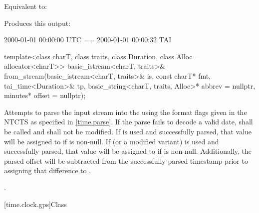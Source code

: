 \begin{itemdescr}
\pnum
\effects
Equivalent to:

\pnum
\begin{example}

Produces this output:

\begin{outputblock}
2000-01-01 00:00:00 UTC == 2000-01-01 00:00:32 TAI
\end{outputblock}
\end{example}
\end{itemdescr}

%
\begin{itemdecl}
template<class charT, class traits, class Duration, class Alloc = allocator<charT>>
  basic_istream<charT, traits>&
    from_stream(basic_istream<charT, traits>& is, const charT* fmt,
                tai_time<Duration>& tp, basic_string<charT, traits, Alloc>* abbrev = nullptr,
                minutes* offset = nullptr);
\end{itemdecl}

\begin{itemdescr}
\pnum
\effects
Attempts to parse the input stream 
into the   using
the format flags given in the NTCTS 
as specified in \ref{time.parse}.
If the parse fails to decode a valid date,
 shall be called
and  shall not be modified.
If  is used and successfully parsed,
that value will be assigned to  if  is non-null.
If  (or a modified variant) is used and successfully parsed,
that value will be assigned to  if  is non-null.
Additionally, the parsed offset will be subtracted from
the successfully parsed timestamp prior to assigning that difference to .

\pnum
\returns
{}.
\end{itemdescr}

[time.clock.gps]{Class }

